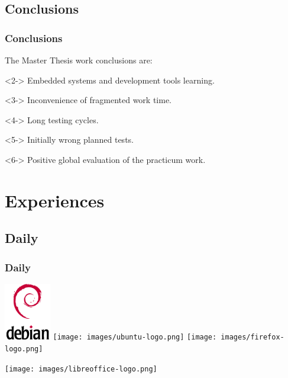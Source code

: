 \documentclass[slidestop,compress,mathserif]{beamer}
\begin{document}
\subsection{Conclusions}
\begin{frame}
  \frametitle{Conclusions}

  The Master Thesis work conclusions are:

  \begin{block}{}<2->
    Embedded systems and development tools learning.
  \end{block}

  \begin{block}{}<3->
    Inconvenience of fragmented work time.
  \end{block}

  \begin{block}{}<4->
    Long testing cycles.
  \end{block}

  \begin{block}{}<5->
    Initially wrong planned tests.
  \end{block}

  \begin{block}{}<6->
    Positive global evaluation of the practicum work.
  \end{block}
\end{frame}

\section{Experiences}
\subsection{Daily}
\begin{frame}
  \frametitle{Daily}
  \includegraphics[height=2.5cm]{images/debian-logo.png}
  \texttt{[image: images/ubuntu-logo.png]}
  \texttt{[image: images/firefox-logo.png]}
  
  \texttt{[image: images/libreoffice-logo.png]}
\end{frame}
\end{document}
